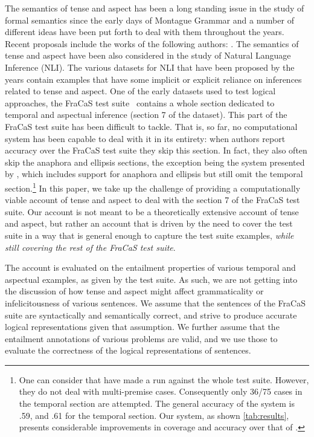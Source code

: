 \documentclass[11pt,a4paper]{article}
\begin{document}
The semantics of tense and aspect has been a long standing issue in
the study of formal semantics since the early days of Montague Grammar
and a number of different ideas have been put forth to
deal with them throughout the years. Recent proposals include the
works of the following authors:
\citet{dowty:2012,prior:2003,steedman_productions_2000,higginbotham:2009,fernando:2015}.
%
The
semantics of tense and aspect have been also considered in the study of
Natural Language Inference (NLI). The various datasets
for NLI that have been proposed by the years contain examples that
have some implicit or explicit reliance on inferences related to tense
and aspect. One of the early datasets used to test logical approaches,
the FraCaS test suite~\citep{cooper:1996} contains a whole section
dedicated to temporal and aspectual inference (section 7 of the dataset). This part
of the FraCaS test suite has been difficult to tackle. That is,
so far, no computational system has been capable to deal with it in its entirety: when
authors report accuracy over the FraCaS test suite they
skip this section.
%
In fact, they also often skip the anaphora and ellipsis sections, the
exception being the system presented by
\citet{bernardy_type-theoretical_2017,bernardy_wide-coverage_2019},
which includes support for anaphora and ellipsis but still omit the
temporal section.\footnote{One can consider that \citet{maccartney:2007} have made a run against the whole test suite. However, they do not deal with multi-premise cases. Consequently only 36/75 cases in the temporal section are attempted. The general accuracy of the system is .59, and .61 for the temporal section. Our system, as shown \cref{tab:results}, presents considerable improvements in coverage and accuracy over that of \citeauthor{maccartney:2007}.}
%
In this paper, we take up the challenge of providing a
computationally viable account of tense and aspect to deal with the
  section 7 of the FraCaS test suite. Our account is not meant
to be a theoretically extensive account of tense and aspect, but rather an
account that is driven by the need to cover the test suite in a way
that is general enough to capture the test suite examples, \emph{while still covering the rest of the FraCaS test suite}.
%

The account is evaluated on the entailment properties of various
temporal and aspectual examples, as given by the test suite. As such,
we are not getting into the discussion of how tense and aspect might
affect grammaticality or infelicitousness of various sentences.
We assume that the sentences of the FraCaS suite are syntactically and
semantically correct, and strive to produce accurate logical
representations given that assumption. We further assume that the
entailment annotations of various problems are valid, and we use those
to evaluate the correctness of the logical representations of
sentences.
\end{document}
